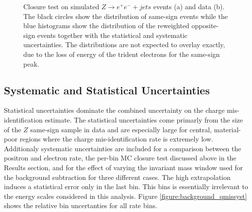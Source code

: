 \begin{figure}[htb!]
\begin{minipage}[h]{0.5\textwidth}
\end{minipage}\hfill
  \caption{Closure test on simulated $Z\rightarrow e^+e^-+jets$ events (a)   and data (b). 
      The black circles show the distribution of same-sign events while the blue histograms
      show the distribution of the reweighted opposite-sign events together with the statistical and systematic uncertainties. The distributions are not
    expected to overlay exactly, due to the loss of energy of the trident electrons for the
    same-sign peak. \label{figure:background_clMll}}
\end{figure}


\subsection{Systematic and Statistical Uncertainties}

Statistical uncertainties dominate the combined uncertainty on the charge mis-identification estimate. The statistical uncertainties come primarly from the size of the $Z$ same-sign sample in data and are especially large for central, material-poor regions where the charge mis-identification rate is extremely low. Additionaly systematic uncertainties are included for a comparison between the positron and electron rate, the per-bin MC closure test discussed above in the Results section, and for the effect of varying the invariant mass window used for the background subtraction for three different cases. The high \pt extrapolation induces a statistical error only in the last \pt bin. This bins is essentially irrelevant to the energy scales considered in this analysis. Figure \ref{figure:background_qmissyst} shows the relative bin uncertanties for all rate bins.



